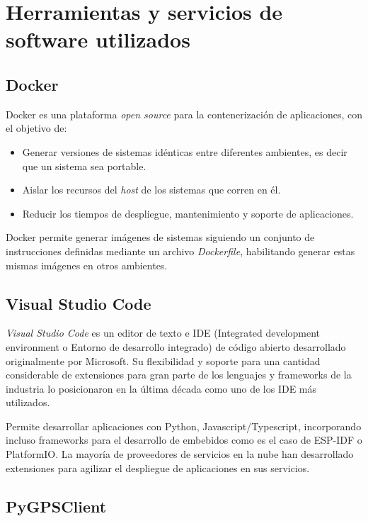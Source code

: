 \section{Herramientas y servicios de software utilizados}

\subsection{Docker}

Docker es una plataforma \textit{open source} para la contenerización de aplicaciones, con el objetivo de\citep{DOCKER:1}:
\begin{itemize}
	\item Generar versiones de sistemas idénticas entre diferentes ambientes, es decir que un sistema sea portable.
	\item Aislar los recursos del \textit{host} de los sistemas que corren en él.
	\item Reducir los tiempos de despliegue, mantenimiento y soporte de aplicaciones.
\end{itemize}

Docker permite generar imágenes de sistemas siguiendo un conjunto de instrucciones definidas mediante un archivo \textit{Dockerfile}, habilitando generar estas mismas imágenes en otros ambientes.

\subsection{Visual Studio Code}

\textit{Visual Studio Code} es un editor de texto e IDE (Integrated development environment o Entorno de desarrollo integrado) de código abierto desarrollado originalmente por Microsoft\citep{VSCODE:1}. Su flexibilidad y soporte para una cantidad considerable de extensiones para gran parte de los lenguajes y frameworks de la industria lo posicionaron en la última década como uno de los IDE más utilizados.

Permite desarrollar aplicaciones con Python, Javascript/Typescript, incorporando incluso frameworks para el desarrollo de embebidos como es el caso de ESP-IDF\citep{ESPIDF:1} o PlatformIO\citep{PLATFORMIO:1}. La mayoría de proveedores de servicios en la nube han desarrollado extensiones para agilizar el despliegue de aplicaciones en sus servicios.

\subsection{PyGPSClient}

